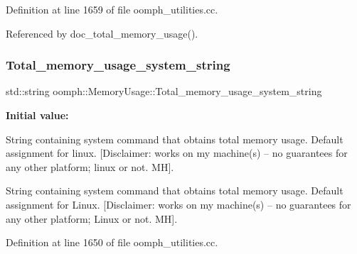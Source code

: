 Definition at line 1659 of file oomph\+\_\+utilities.\+cc.



Referenced by doc\+\_\+total\+\_\+memory\+\_\+usage().

\mbox{\label{namespaceoomph_1_1MemoryUsage_a9b915316a3658a60e8fa86490c8d013a}} 
\subsubsection{\texorpdfstring{Total\+\_\+memory\+\_\+usage\+\_\+system\+\_\+string}{Total\_memory\_usage\_system\_string}}
{\footnotesize\ttfamily std\+::string oomph\+::\+Memory\+Usage\+::\+Total\+\_\+memory\+\_\+usage\+\_\+system\+\_\+string}

{\bfseries Initial value\+:}


String containing system command that obtains total memory usage. Default assignment for linux. \mbox{[}Disclaimer\+: works on my machine(s) -- no guarantees for any other platform; linux or not. MH\mbox{]}. 

String containing system command that obtains total memory usage. Default assignment for Linux. \mbox{[}Disclaimer\+: works on my machine(s) -- no guarantees for any other platform; Linux or not. MH\mbox{]}. 

Definition at line 1650 of file oomph\+\_\+utilities.\+cc.

